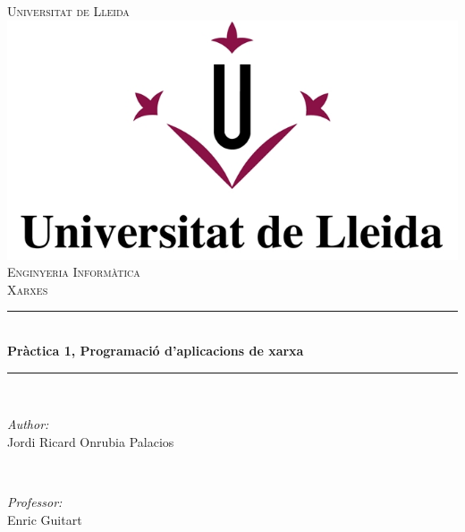 \documentclass[11pt]{article}
\begin{document}
\begin{titlepage}

\newcommand{\HRule}{\rule{\linewidth}{0.5mm}} %

\center %
 

\textsc{\LARGE Universitat de Lleida}\\[1.5cm] %
\includegraphics{Images/logoUDL.jpg}\\[1cm] %
\textsc{\Large Enginyeria Informàtica}\\[0.5cm] %
\textsc{\large Xarxes}\\[0.5cm] %


\HRule \\[0.4cm]
{ \huge \bfseries Pràctica 1, Programació d’aplicacions de xarxa}\\[0.4cm] %
\HRule \\[1.5cm]
 

\begin{minipage}{0.4\textwidth}
\begin{flushleft} \large
\emph{Author:}\\
Jordi Ricard Onrubia Palacios %
\end{flushleft}
\end{minipage}
~
\begin{minipage}{0.4\textwidth}
\begin{flushright} \large
\emph{Professor:} \\
Enric Guitart %
\end{flushright}
\end{minipage}\\[4cm]


\end{titlepage}
\end{document}
